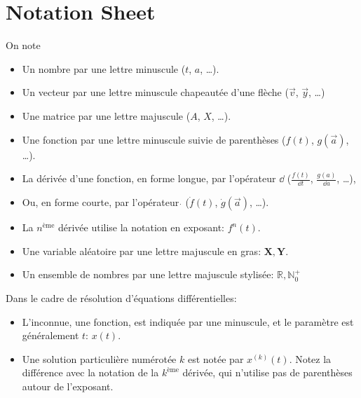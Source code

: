 \chapter*{Notation Sheet}
On note
\begin{itemize}
    \item Un nombre par une lettre minuscule ($t$, $a$, \ldots).
    \item Un vecteur par une lettre minuscule chapeautée d'une flèche ($\overrightarrow{v}$, $\overrightarrow{y}$, \ldots)
    \item Une matrice par une lettre majuscule ($A$, $X$, \ldots).
    \item Une fonction par une lettre minuscule suivie de parenthèses ($f(t)$, $g(\overrightarrow{a})$, \ldots).
    \item La dérivée d'une fonction, en forme longue, par l'opérateur $\dd $ ($\frac{f(t)}{\dd t}$, $\frac{g(a)}{\dd a}$, \ldots), 
    \item Ou, en forme courte, par l'opérateur $\dot{}$ ($\dot{f}(t)$, $\dot{g}(\overrightarrow{a})$, \ldots).
    \item La $n^{\text{ème}}$ dérivée utilise la notation en exposant: $f^n(t)$.
    \item Une variable aléatoire par une lettre majuscule en gras: $\mathbf{X}, \mathbf{Y}$.
    \item Un ensemble de nombres par une lettre majuscule stylisée: $\mathbb{R}, \mathbb{N}_0^+$
\end{itemize}

Dans le cadre de résolution d'équations différentielles:
\begin{itemize}
    \item L'inconnue, une fonction, est indiquée par une minuscule, et le paramètre est généralement $t$: $x(t)$.
    \item Une solution particulière numérotée $k$ est notée par $x^{(k)}(t)$. Notez la différence avec la notation de la $k^{\text{ème}}$ dérivée, qui n'utilise pas de parenthèses autour de l'exposant.
\end{itemize}